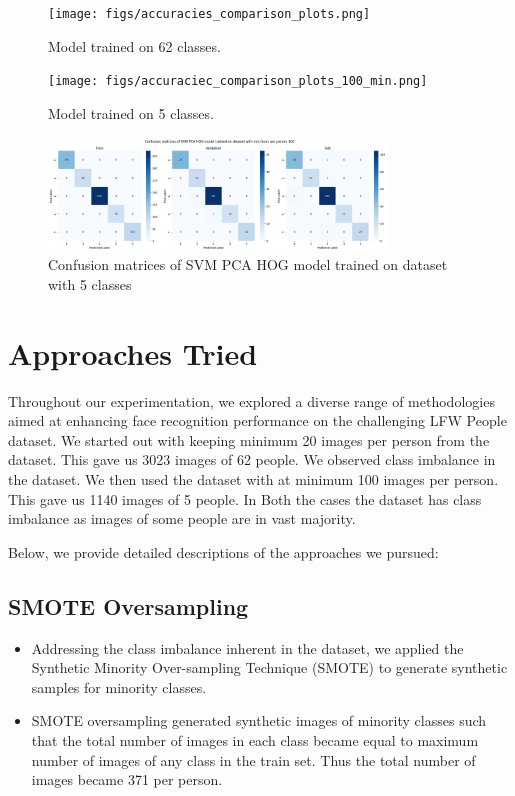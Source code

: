 \documentclass[a4paper]{article}
\theoremstyle{plain}
\theoremstyle{definition}
\begin{document}
	\begin{figure}[!htb]
        \centering
        \texttt{[image: figs/accuracies\_comparison\_plots.png]}
        \caption{ Model trained on 62 classes.}
        \label{fig:img4}
    \end{figure}

    \begin{figure}[!htb]
    \centering
    \texttt{[image: figs/accuraciec\_comparison\_plots\_100\_min.png]}
    \caption{Model trained on 5 classes.}
    \label{fig:img5}
\end{figure}

    \begin{figure}[!htb]
    \centering
    \includegraphics[width=0.8\textwidth]
    {figs/confusion_matrices_svm_pca_hog_min_100.png}
    \caption{Confusion matrices of SVM PCA HOG model trained on dataset with 5 classes}
    \label{fig:img5}
\end{figure}

\clearpage
	
	\section{Approaches Tried}
	\label{sec:app}

        Throughout our experimentation, we explored a diverse range of methodologies aimed at enhancing face recognition performance on the challenging LFW People dataset. We started out with keeping minimum 20 images per person from the dataset. This gave us 3023 images of 62 people. We observed class imbalance in the dataset. We then used the dataset with at minimum 100 images per person. This gave us 1140 images of 5 people. In Both the cases the dataset has class imbalance as images of some people are in vast majority.
        
        Below, we provide detailed descriptions of the approaches we pursued:

\subsection{SMOTE Oversampling}
   \begin{itemize}
       \item Addressing the class imbalance inherent in the dataset, we applied the Synthetic Minority Over-sampling Technique (SMOTE) to generate synthetic samples for minority classes.
       \item SMOTE oversampling generated synthetic images of minority classes such that the total number of images in each class became equal to maximum number of images of any class in the train set. Thus the total number of images became 371 per person.
   \end{itemize}
\end{document}

